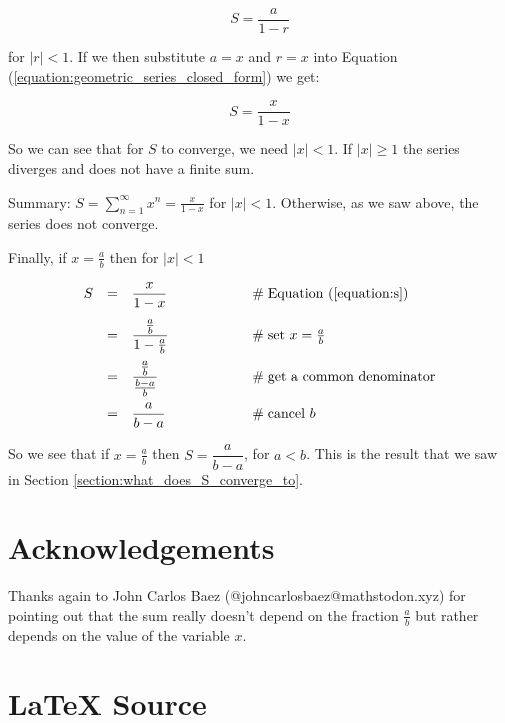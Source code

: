 \documentclass{article}
\theoremstyle{definition}
\begin{document}
\begin{equation}
S = \frac{a}{1 - r}
\label{equation:geometric_series_closed_form}
\end{equation}

\smallskip
\noindent
for $|r| < 1$. If we then substitute $a = x$ and $r = x$ into Equation 
(\ref{equation:geometric_series_closed_form}) we get:

\begin{equation}
S = \frac{x}{1 - x}
\label{equation:s}
\end{equation}


\noindent
So we can see that for $S$ to converge, we need $|x| <
1$. If $|x| \geq 1$ the series diverges and does not have a
finite sum.

\bigskip
\noindent
Summary: $S = \sum\limits_{n=1}^{\infty} x^n = \frac{x}{1 - x}$
for $|x| < 1$. Otherwise, as we saw above, the series does not
converge.

\bigskip
\noindent
Finally, if $x = \frac{a}{b}$ then for $|x| < 1$

\begin{equation*}
\begin{array}{lllll}
S 
&=& \dfrac{x}{1 - x} 						&\hspace{5em} \mathrel{\#} \text{Equation (\ref{equation:s})} \\ 
[12pt]
&=& \dfrac{\frac{a}{b}}{1 - \frac{a}{b}}	&\hspace{5em} \mathrel{\#} \text{set $x = \frac{a}{b}$} \\ 
[12pt]
&=& \dfrac{\frac{a}{b}}{\frac{b -a}{b}} 	&\hspace{5em} \mathrel{\#} \text{get a common denominator} \\ 
[12pt]
&=& \dfrac{a}{b-a} 							&\hspace{5em} \mathrel{\#} \text{cancel $b$} \\ 
\end{array}
\end{equation*}

\medskip
\noindent
So we see that if $x = \frac{a}{b}$ then $S = \dfrac{a}{b-a}$, for $a < b$. This
is the result that we saw in Section \ref{section:what_does_S_converge_to}.


%
%
%
%
\section*{Acknowledgements}
Thanks again to John Carlos Baez (@johncarlosbaez@mathstodon.xyz)
for pointing out that the sum really doesn't depend on the
fraction $\frac{a}{b}$ but rather depends on the value of the
variable $x$.
%
%
\section*{\LaTeX \hspace{0.10 mm} Source}
%
%
%


%
%
\end{document}

